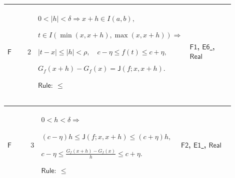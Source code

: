 \documentclass[12pt,reqno]{amsart}
\theoremstyle{blueplain}
\numberwithin{equation}{section}
\begin{document}
{\scriptsize \setlength{\parskip}{0pt}\nointerlineskip
\noindent 
\begin{tabular}{|@{}>{\centering\arraybackslash}m{0.10658\linewidth}|>{\centering\arraybackslash}m{0.03553\linewidth}|>{\centering\arraybackslash}m{0.52105\linewidth}|>{\centering\arraybackslash}m{0.23684\linewidth}|}
\hline
\hypertarget{proof:F2}{$\displaystyle \mathsf{F}$} & $\displaystyle 2$ & $%
\displaystyle 0<|h|<\delta\Rightarrow x+h\in I(a,b),$\par$\displaystyle t\in
I(\min(x,x+h),\max(x,x+h))\Rightarrow$\par$\displaystyle |t-x|\le|h|<\rho,%
\quad c-\eta\le f(t)\le c+\eta,$\par$\displaystyle G_f(x+h)-G_f(x)=\mathsf{J}%
(f;x,x+h).$\par$\displaystyle \mathsf{Rule}:\ \le$ & \hyperlink{proof:F1}{$%
\displaystyle \mathsf{F1}$}, \hyperlink{proof:E6}{$\displaystyle \mathsf{E6}$%
}, \hyperlink{ax:Real}{$\displaystyle \mathsf{Real}$} \\ \hline
\end{tabular}%
}

{\scriptsize \setlength{\parskip}{0pt}\nointerlineskip
\noindent 
\begin{tabular}{|@{}>{\centering\arraybackslash}m{0.10658\linewidth}|>{\centering\arraybackslash}m{0.03553\linewidth}|>{\centering\arraybackslash}m{0.52105\linewidth}|>{\centering\arraybackslash}m{0.23684\linewidth}|}
\hline
\hypertarget{proof:F3}{$\displaystyle \mathsf{F}$} & $\displaystyle 3$ & $%
\displaystyle 0<h<\delta\Rightarrow$\par$\displaystyle (c-\eta)h\le\mathsf{J}%
(f;x,x+h)\le(c+\eta)h,$\par$\displaystyle c-\eta\le\frac{G_f(x+h)-G_f(x)}%
h\le c+\eta.$\par$\displaystyle \mathsf{Rule}:\ \le$ & \hyperlink{proof:F2}{$%
\displaystyle \mathsf{F2}$}, \hyperlink{proof:E1}{$\displaystyle \mathsf{E1}$%
}, \hyperlink{ax:Real}{$\displaystyle \mathsf{Real}$} \\ \hline
\end{tabular}%
}
\end{document}
